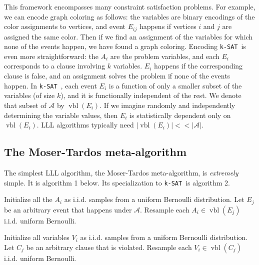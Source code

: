 \documentclass[twocolumn]{article}
\newcommand{\ksat}{\texttt{k-SAT}~}
\begin{document}
This framework encompasses many constraint satisfaction problems.  For example, we can encode graph coloring as follows: the variables are binary encodings of the color assignments to vertices, and event $E_{ij}$ happens if vertices $i$ and $j$ are assigned the same color.  Then if we find an assignment of the variables for which none of the events happen, we have found a graph coloring.  Encoding \ksat is even more straightforward: the $A_i$ are the problem variables, and each $E_i$ corresponds to a clause involving $k$ variables.  $E_i$ happens if the corresponding clause is false, and an assignment solves the problem if none of the events happen.  In \ksat, each event $E_i$ is a function of only a smaller subset of the variables (of size $k$), and it is functionally independent of the rest.  We denote that subset of $\mathcal{A}$ by $\operatorname{vbl}(E_i)$.  If we imagine randomly and independently determining the variable values, then $E_i$ is statistically dependent only on $\operatorname{vbl}(E_i)$.  LLL algorithms typically need $|\operatorname{vbl}(E_i)| << |\mathcal{A}|$.

\subsection{The Moser-Tardos meta-algorithm}
The simplest LLL algorithm, the Moser-Tardos meta-algorithm, is \emph{extremely} simple.  It is algorithm 1 below.  Its specialization to \ksat is algorithm 2.

\begin{algorithm}[H]
\label{alg:mt-meta}
\begin{algorithmic}[1]
\State Initialize all the $A_i$ as i.i.d. samples from a uniform Bernoulli distribution.
  \State Let $E_j$ be an arbitrary event that happens under $\mathcal{A}$.
  \State Resample each $A_i \in \operatorname{vbl}(E_j)$ i.i.d. uniform Bernoulli.
\EndWhile
\end{algorithmic}
\caption{The Moser-Tardos meta-algorithm.}
\end{algorithm}

\begin{algorithm}[H]
\label{alg:mt-ksat}
\begin{algorithmic}[1]
\State Initialize all variables $V_i$ as i.i.d. samples from a uniform Bernoulli distribution.
  \State Let $C_j$ be an arbitrary clause that is violated.
  \State Resample each $V_i \in \operatorname{vbl}(C_j)$ i.i.d. uniform Bernoulli.
\EndWhile
\end{algorithmic}
\caption{The Moser-Tardos meta-algorithm, specialized to \ksat.}
\end{algorithm}
\end{document}
